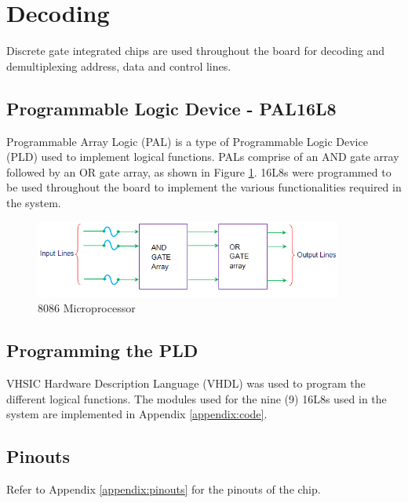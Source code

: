 \section{Decoding}
Discrete gate integrated chips are used throughout the board for decoding and demultiplexing address, data and control lines.

    \subsection{Programmable Logic Device - PAL16L8}
    Programmable Array Logic (PAL) is a type of Programmable Logic Device (PLD) used to implement logical functions. \cite{pal} PALs comprise of an AND gate array followed by an OR gate array, as shown in Figure \ref{fig:pal}.\n
    16L8s were programmed to be used throughout the board to implement the various functionalities required in the system.

        \begin{figure}[h]
            \begin{center}
                \includegraphics[width=0.9\textwidth]{figures/pal.png}
                \caption{8086 Microprocessor} \label{fig:pal}
            \end{center}
        \end{figure}


    \subsection{Programming the PLD}
    VHSIC Hardware Description Language (VHDL) was used to program the different logical functions. The modules used for the nine (9) 16L8s used in the system are implemented in Appendix \ref{appendix:code}.

    \subsection{Pinouts}
    Refer to Appendix \ref{appendix:pinouts} for the pinouts of the chip.
